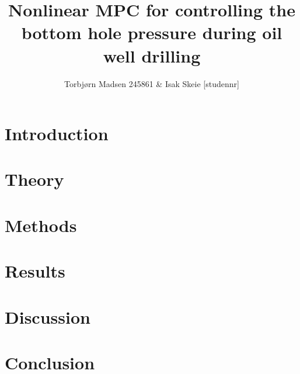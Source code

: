 \documentclass{article}
\title{Nonlinear MPC for controlling the bottom hole pressure during oil well drilling}
\author{Torbjørn Madsen 245861 \&  Isak Skeie [studennr]}
\begin{document}
\maketitle

\begin{abstract}

\end{abstract}
\newpage

\tableofcontents
\listoffigures
\listoftables
\newpage

\section{Introduction}

\newpage

\section{Theory}

\newpage

\section{Methods}

\newpage

\section{Results}

\newpage

\section{Discussion}

\newpage

\section{Conclusion}

\newpage

%



\end{document}
